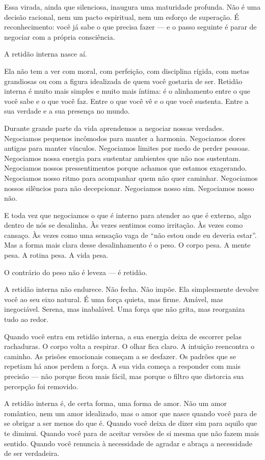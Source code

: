 \documentclass[12pt]{book}
\begin{document}
Essa virada, ainda que silenciosa, inaugura uma maturidade profunda. Não é uma decisão racional, nem um pacto espiritual, nem um esforço de superação. É reconhecimento: você já sabe o que precisa fazer — e o passo seguinte é parar de negociar com a própria consciência.

A retidão interna nasce aí.

Ela não tem a ver com moral, com perfeição, com disciplina rígida, com metas grandiosas ou com a figura idealizada de quem você gostaria de ser. Retidão interna é muito mais simples e muito mais íntima: é o alinhamento entre o que você sabe e o que você faz. Entre o que você vê e o que você sustenta. Entre a sua verdade e a sua presença no mundo.

Durante grande parte da vida aprendemos a negociar nossas verdades. Negociamos pequenos incômodos para manter a harmonia. Negociamos dores antigas para manter vínculos. Negociamos limites por medo de perder pessoas. Negociamos nossa energia para sustentar ambientes que não nos sustentam. Negociamos nossos pressentimentos porque achamos que estamos exagerando. Negociamos nosso ritmo para acompanhar quem não quer caminhar. Negociamos nossos silêncios para não decepcionar. Negociamos nosso sim. Negociamos nosso não.

E toda vez que negociamos o que é interno para atender ao que é externo, algo dentro de nós se desalinha. Às vezes sentimos como irritação. Às vezes como cansaço. Às vezes como uma sensação vaga de “não estou onde eu deveria estar”. Mas a forma mais clara desse desalinhamento é o peso. O corpo pesa. A mente pesa. A rotina pesa. A vida pesa.

O contrário do peso não é leveza — é retidão.

A retidão interna não endurece. Não fecha. Não impõe. Ela simplesmente devolve você ao seu eixo natural. É uma força quieta, mas firme. Amável, mas inegociável. Serena, mas inabalável. Uma força que não grita, mas reorganiza tudo ao redor.

Quando você entra em retidão interna, a sua energia deixa de escorrer pelas rachaduras. O corpo volta a respirar. O olhar fica claro. A intuição reencontra o caminho. As prisões emocionais começam a se desfazer. Os padrões que se repetiam há anos perdem a força. A sua vida começa a responder com mais precisão — não porque ficou mais fácil, mas porque o filtro que distorcia sua percepção foi removido.

A retidão interna é, de certa forma, uma forma de amor. Não um amor romântico, nem um amor idealizado, mas o amor que nasce quando você para de se obrigar a ser menos do que é. Quando você deixa de dizer sim para aquilo que te diminui. Quando você para de aceitar versões de si mesma que não fazem mais sentido. Quando você renuncia à necessidade de agradar e abraça a necessidade de ser verdadeira.
\end{document}
